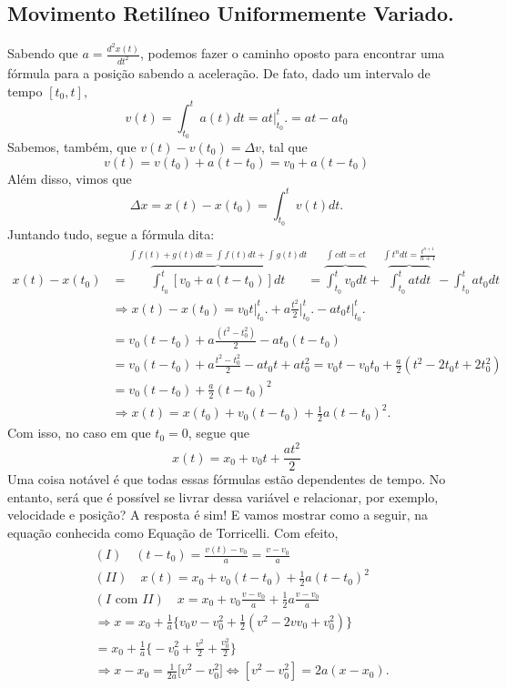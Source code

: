 \documentclass{article}
\begin{document}
\subsection{Movimento Retil\'ineo Uniformemente Variado.}
  Sabendo que $a =\displaystyle \frac{d^{2}x(t)}{dt^{2}}$, podemos fazer o caminho oposto para encontrar uma f\'ormula para
  a posi\c c\~ao sabendo a acelera\c c\~ao. De fato, dado um intervalo de tempo $[t_{0}, t],$
  $$
    v(t) = \int_{t_{0}}^{t}a(t)dt = at \biggl|_{t_{0}}^{t}\biggr. = at - at_{0}
  $$
  Sabemos, tamb\'em, que $v(t) - v(t_{0}) = \Delta v$, tal que 
    $$
      v(t) = v(t_{0}) + a(t-t_{0}) = v_{0} + a(t-t_{0})
    $$
  Al\'em disso, vimos que 
    $$
      \Delta x = x(t) - x(t_{0}) = \int_{t_{0}}^{t}v(t) dt.
    $$
  Juntando tudo, segue a f\'ormula dita: 
  \begin{align*}
    x(t) - x(t_{0}) &= \overbrace{\int_{t_{0}}^{t}[v_{0} + a(t-t_{0})]dt}^{\int_{}^{}f(t) + g(t)dt = \int_{}^{}f(t)dt + \int_{}^{}g(t)dt}= \overbrace{\int_{t_{0}}^{t}v_{0}dt}^{\int_{}^{}c dt = ct} + \overbrace{\int_{t_{0}}^{t}atdt}^{\int_{}^{}t^{n}dt = \frac{t^{n+1}}{n+1}} - \int_{t_{0}}^{t}at_{0}dt\\
                    & \Rightarrow x(t) - x(t_{0})  =  v_{0}t \biggl|_{t_{0}}^{t}\biggr. + a\frac{t^{2}}{2} \biggl|_{t_{0}}^{t}\biggr. - at_{0}t \biggl|_{t_{0}}^{t}\biggr. \\
                    &= v_{0}(t-t_{0}) + a \frac{(t^{2} - t_{0}^{2})}{2} - at_{0}(t-t_{0}) \\
                    &= v_{0}(t-t_{0}) + a \frac{t^{2}-t_{0}^{2}}{2} - at_{0}t + at_{0}^{2} = v_{0}t - v_{0}t_{0} + \frac{a}{2}(t^{2}-2t_{0}t + 2t_{0}^{2})\\
                    &= v_{0}(t-t_{0}) + \frac{a}{2}(t-t_{0})^{2}\\
                    & \Rightarrow x(t) = x(t_{0}) + v_{0}(t-t_{0}) + \frac{1}{2}a(t-t_{0})^{2}.
  \end{align*}
  Com isso, no caso em que $t_{0} = 0$, segue que 
   $$
    \boxed{x(t) = x_{0} + v_{0}t + \frac{at^{2}}{2}}     
   $$
  Uma coisa not\'avel \'e que todas essas f\'ormulas est\~ao dependentes de tempo. No entanto, ser\'a que \'e poss\'ivel
se livrar dessa vari\'avel e relacionar, por exemplo, velocidade e posi\c c\~ao? A resposta \'e sim! E vamos mostrar como a seguir,
na equa\c c\~ao conhecida como Equa\c c\~ao de Torricelli. Com efeito,
 \begin{align*}
   &(I)\quad (t-t_{0}) = \frac{v(t)-v_{0}}{a} = \frac{v-v_{0}}{a}\\
   &(II)\quad x(t) = x_{0} + v_{0}(t-t_{0}) + \frac{1}{2}a(t-t_{0})^{2}\\
   &(I\text{ com }II)\quad x = x_{0} + v_{0}\frac{v-v_{0}}{a} + \frac{1}{2}a \frac{v-v_{0}}{a} \\
   & \Rightarrow x = x_{0} + \frac{1}{a}\biggl\{v_{0}v - v_{0}^{2} + \frac{1}{2}(v^{2}-2vv_{0}+v_{0}^{2})\biggr\}\\
   & = x_{0} + \frac{1}{a}\biggl\{-v_{0}^{2} + \frac{v^{2}}{2} + \frac{v_{0}^{2}}{2}\biggr\}\\
   & \Rightarrow x - x_{0} = \frac{1}{2a}\biggl[v^{2}-v_{0}^{2}\biggr] \Longleftrightarrow [v^{2} - v_{0}^{2}] = 2a(x-x_{0}).
 \end{align*}
\end{document}
